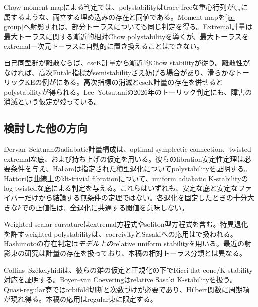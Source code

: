 \documentclass[12pt]{amsart}
\theoremstyle{definition}
\theoremstyle{remark}
\numberwithin{equation}{section}
\begin{document}
Chow moment mapによる判定では、polystabilityはtrace-freeな重心行列が$\mathfrak t_m$に属するような、両立する埋め込みの存在と同値である\cite[Theorem 3.4]{ja-Tip}。Moment mapを\eqref{ja-group}へ射影すれば、部分トーラスについても同じ判定を得る。Extremal計量は最大トーラスに関する漸近的相対Chow polystabilityを導く\cite{ja-Mab16,ja-Sey,ja-ST}が、最大トーラスをextremal一次元トーラスに自動的に置き換えることはできない。

自己同型群が離散ならば、cscK計量から漸近的Chow stabilityが従う\cite{ja-Don01}。離散性がなければ、高次Futaki指標がsemistabilityさえ妨げる場合があり、滑らかなトーリックKEの例が\cite{ja-OSY}にある。高次指標の消滅とcscK計量の存在を併せるとpolystabilityが得られる\cite{ja-Mab05,ja-Fut04}。Lee--Yotsutaniの2026年のトーリック判定にも、障害の消滅という仮定が残っている\cite{ja-LY26}。

\subsection{検討した他の方向}
Dervan--Sektnanのadiabatic計量構成は、optimal symplectic connection、twisted extremalな底、および持ち上げの仮定を用いる\cite{ja-DS19}。彼らのfibration安定性定理は必要条件を与え\cite{ja-DS20}、Hallamは指定された積型退化についてpolystabilityを証明する\cite[Theorem 1.4]{ja-Hal20}。Hattoriは曲線上のklt-trivial fibrationについて、uniform adiabatic K-stabilityのlog-twistedな底による判定を与える\cite[Theorem 1.1]{ja-Hat}。これらはいずれも、安定な底と安定なファイバーだけから結論する無条件の定理ではない。各退化を固定したときの十分大きな$k$での正値性は、全退化に共通する閾値を意味しない。

Weighted scalar curvatureはextremal方程式やsoliton型方程式を含む\cite{ja-Lah}。特異退化を許すweighted polystabilityは\cite{ja-Hal23}、coercivityとSasakiへの応用は\cite{ja-AJL}で扱われる。Hashimotoの存在判定は\emph{モデル上の}relative uniform stabilityを用いる\cite[Theorem 1.1]{ja-Has25}。最近の射影束の研究\cite{ja-Jub26}は計量の存在を扱っており、本稿の相対トーラス分類とは異なる。

Collins--Székelyhidiは、彼らの錐の仮定と正規化の下でRicci-flat cone/K-stability対応を証明する\cite{ja-CS}。Boyer--van Coeveringはrelative Sasaki K-stabilityを扱う\cite{ja-BvC}。Quasi-regular商ではorbifold切断と次数づけが必要であり、Hilbert関数に周期項が現れ得る。本稿の応用はregular束に限定する。
\end{document}
